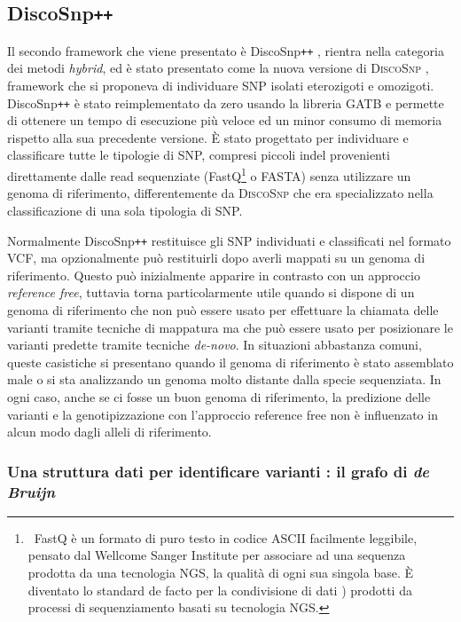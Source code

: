 \documentclass[../main.tex]{subfiles}
\begin{document}
\subsection{DiscoSnp\texttt{++}}
\label{discosnp++}

Il secondo framework che viene presentato è DiscoSnp\texttt{++} \cite{peterlongo2017discosnp++}, rientra nella categoria dei metodi \textit{hybrid}, ed è stato presentato come la nuova versione di \textsc{DiscoSnp} \cite{uricaru2015reference}, framework che si proponeva di individuare SNP isolati eterozigoti e omozigoti. DiscoSnp\texttt{++} è stato reimplementato da zero usando la libreria GATB \cite{drezen2014gatb} e permette di ottenere un tempo di esecuzione più veloce ed un minor consumo di memoria rispetto alla sua precedente versione. È stato progettato per individuare e classificare tutte le tipologie di SNP, compresi piccoli indel provenienti direttamente dalle read sequenziate (FastQ\footnote{\ FastQ è un formato di puro testo in codice ASCII facilmente leggibile, pensato dal Wellcome Sanger Institute per associare ad una sequenza prodotta da una tecnologia NGS, la qualità di ogni sua singola base. È diventato lo standard de facto per la condivisione di dati \cite{cock2010sanger}) prodotti da processi di sequenziamento basati su tecnologia NGS.} o FASTA) senza utilizzare un genoma di riferimento, differentemente da \textsc{DiscoSnp} che era specializzato nella classificazione di una sola tipologia di SNP.

Normalmente DiscoSnp\texttt{++} restituisce gli SNP individuati e classificati nel formato VCF, ma opzionalmente può restituirli dopo averli mappati su un genoma di riferimento. Questo può inizialmente apparire in contrasto con un approccio \textit{reference free}, tuttavia torna particolarmente utile quando si dispone di un genoma di riferimento che non può essere usato per effettuare la chiamata delle varianti tramite tecniche di mappatura ma che può essere usato per posizionare le varianti predette tramite tecniche \textit{de-novo}. In situazioni abbastanza comuni, queste casistiche si presentano quando il genoma di riferimento è stato assemblato male o si sta analizzando un genoma molto distante dalla specie sequenziata. In ogni caso, anche se ci fosse un buon genoma di riferimento, la predizione delle varianti e la genotipizzazione con l'approccio reference free non è influenzato in alcun modo dagli alleli di riferimento.

\subsubsection{Una struttura dati per identificare varianti : il grafo di \textit{de Bruijn}}
\label{dBG}
\end{document}

